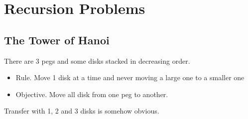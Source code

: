 \chapter{Recursion Problems}

\section{The Tower of Hanoi}

 There are 3 pegs and some disks stacked in decreasing order.

\begin{itemize}

    \item Rule. Move 1 disk at a time and never moving a large one to a smaller one
    \item Objective. Move all disk from one peg to another. 

\end{itemize}

 Transfer with 1, 2 and 3 disks is somehow obvious. 



